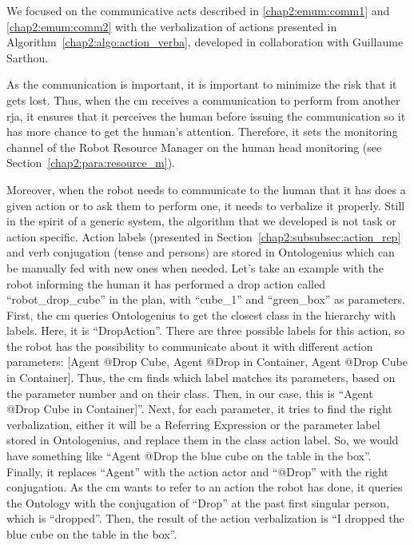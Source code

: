 \documentclass[a4paper,11pt,twoside]{StyleThese}
\begin{document}
We focused on the communicative acts described in \ref{chap2:emum:comm1} and \ref{chap2:emum:comm2} with the verbalization of actions presented in Algorithm~\ref{chap2:algo:action_verba}, developed in collaboration with Guillaume Sarthou. 

As the communication is important, it is important to minimize the risk that it gets lost. Thus, when the \acrshort{cm} receives a communication to perform from another \acrshort{rja}, it ensures that it perceives the human before issuing the communication so it has more chance to get the human's attention. Therefore, it sets the monitoring channel of the Robot Resource Manager on the human head monitoring (see Section~\ref{chap2:para:resource_m}).

Moreover, when the robot needs to communicate to the human that it has does a given action or to ask them to perform one, it needs to verbalize it properly. Still in the spirit of a generic system, the algorithm that we developed is not task or action specific. Action labels (presented in Section~\ref{chap2:subsubsec:action_rep} and verb conjugation (tense and persons) are stored in Ontologenius which can be manually fed with new ones when needed. Let's take an example with the robot informing the human it has performed a drop action called ``robot\_drop\_cube'' in the plan, with ``cube\_1'' and ``green\_box'' as parameters. First, the \acrshort{cm} queries Ontologenius to get the closest class in the hierarchy with labels. Here, it is ``DropAction''. There are three possible labels for this action, so the robot has the possibility to communicate about it with different action parameters: [{Agent} @Drop {Cube}, {Agent} @Drop in {Container}, {Agent} @Drop {Cube} in {Container}]. Thus, the \acrshort{cm} finds which label matches its parameters, based on the parameter number and on their class. Then, in our case, this is ``{Agent} @Drop {Cube} in {Container}]''. Next, for each parameter, it tries to find the right verbalization, either it will be a Referring Expression or the parameter label stored in Ontologenius, and replace them in the class action label. So, we would have something like ``{Agent} @Drop the blue cube on the table in the box''. Finally, it replaces ``{Agent}'' with the action actor and ``@Drop'' with the right conjugation. As the \acrshort{cm} wants to refer to an action the robot has done, it queries the Ontology with the conjugation of ``Drop'' at the past first singular person, which is ``dropped''. Then, the result of the action verbalization is ``I dropped the blue cube on the table in the box''. 
\end{document}
